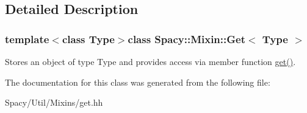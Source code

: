 \subsection{Detailed Description}
\subsubsection*{template$<$class Type$>$class Spacy\+::\+Mixin\+::\+Get$<$ Type $>$}

Stores an object of type Type and provides access via member function \hyperlink{classSpacy_1_1Mixin_1_1Get_aaa3afedcb9b9e943f81d1686b70417db}{get()}. 

The documentation for this class was generated from the following file\+:\begin{DoxyCompactItemize}
\item 
Spacy/\+Util/\+Mixins/get.\+hh\end{DoxyCompactItemize}
